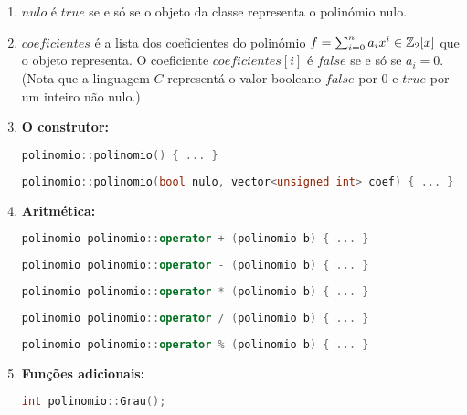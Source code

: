 \begin{enumerate}
\item $nulo$ é $true$ se e só se o objeto da classe \poli representa o polinómio nulo.
\item $coeficientes$ é a lista dos coeficientes do polinómio $f=\sum_{i=0}^n a_i x^i \in \mathbb{Z}_2[x]$ que o objeto representa. O coeficiente $coeficientes[i]$ é $false$ se e só se $a_i=0$. (Nota que a linguagem $C$ representá o valor booleano $false$ por $0$ e $true$ por um inteiro não nulo.)
\item \setlength{\leftskip}{4mm} {\bf O construtor:}
\begin{lstlisting}[language=C++]
polinomio::polinomio() { ... }
\end{lstlisting}
\begin{lstlisting}[language=C++]
polinomio::polinomio(bool nulo, vector<unsigned int> coef) { ... }
\end{lstlisting}

\item \setlength{\leftskip}{4mm} {\bf Aritmética:}
\begin{lstlisting}[language=C++]
polinomio polinomio::operator + (polinomio b) { ... }
\end{lstlisting}
\begin{lstlisting}[language=C++]
polinomio polinomio::operator - (polinomio b) { ... }
\end{lstlisting}
\begin{lstlisting}[language=C++]
polinomio polinomio::operator * (polinomio b) { ... }
\end{lstlisting}
\begin{lstlisting}[language=C++]
polinomio polinomio::operator / (polinomio b) { ... }
\end{lstlisting}
\begin{lstlisting}[language=C++]
polinomio polinomio::operator % (polinomio b) { ... }
\end{lstlisting}
\item \setlength{\leftskip}{4mm} {\bf Funções adicionais:}
\begin{lstlisting}[language=C++]
int polinomio::Grau();
\end{lstlisting}


\end{enumerate}
